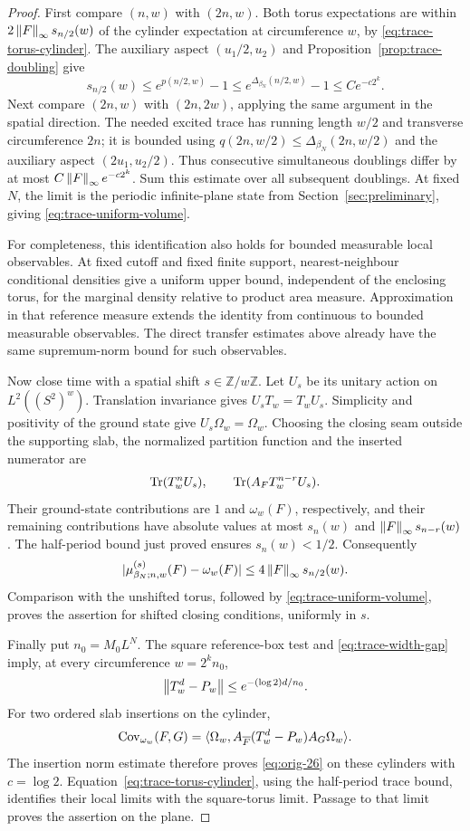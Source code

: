 \begin{proof}
First compare $(n,w)$ with $(2n,w)$.  Both torus expectations are
within $2\left\lVert F\right\rVert_\infty s_{n/2}(w)$ of the cylinder expectation at
circumference $w$, by \eqref{eq:trace-torus-cylinder}.  The auxiliary
aspect $(u_1/2,u_2)$ and Proposition~\ref{prop:trace-doubling} give
\[
 s_{n/2}(w)
    \le e^{p(n/2,w)}-1
    \le e^{\Delta_{\beta_N}(n/2,w)}-1
    \le C e^{-c2^k}.
\]
Next compare $(2n,w)$ with $(2n,2w)$, applying the same argument in
the spatial direction.  The needed excited trace has running length
$w/2$ and transverse circumference $2n$; it is bounded using
$q(2n,w/2)\le\Delta_{\beta_N}(2n,w/2)$ and the auxiliary aspect
$(2u_1,u_2/2)$.  Thus consecutive simultaneous doublings differ by
at most $C\left\lVert F\right\rVert_\infty e^{-c2^k}$.  Sum this estimate over all
subsequent doublings.  At fixed $N$, the limit is the periodic
infinite-plane state from Section~\ref{sec:preliminary}, giving
\eqref{eq:trace-uniform-volume}.

For completeness, this identification also holds for bounded
measurable local observables.  At fixed cutoff and fixed finite
support, nearest-neighbour conditional densities give a uniform upper
bound, independent of the enclosing torus, for the marginal density
relative to product area measure.  Approximation in that reference
measure extends the identity from continuous to bounded measurable
observables.  The direct transfer estimates above already have the
same supremum-norm bound for such observables.

Now close time with a spatial shift $s\in\mathbb Z/w\mathbb Z$.
Let $U_s$ be its unitary action on $L^2((S^2)^w)$.  Translation
invariance gives $U_sT_w=T_wU_s$.  Simplicity and positivity of the
ground state give $U_s\Omega_w=\Omega_w$.  Choosing the closing seam
outside the supporting slab, the normalized partition function and
the inserted numerator are
\[
 \operatorname{Tr}(T_w^nU_s),\qquad \operatorname{Tr}(A_FT_w^{n-r}U_s).
\]
Their ground-state contributions are $1$ and $\omega_w(F)$,
respectively, and their remaining contributions have absolute values
at most $s_n(w)$ and $\left\lVert F\right\rVert_\infty s_{n-r}(w)$.  The half-period
bound just proved ensures $s_n(w)<1/2$.  Consequently
\[
 |\mu_{\beta_N;n,w}^{(s)}(F)-\omega_w(F)|
     \le4\left\lVert F\right\rVert_\infty s_{n/2}(w).
\]
Comparison with the unshifted torus, followed by
\eqref{eq:trace-uniform-volume}, proves the assertion for shifted
closing conditions, uniformly in $s$.

Finally put $n_0=M_0L^N$.  The square reference-box test and
\eqref{eq:trace-width-gap} imply, at every circumference
$w=2^kn_0$,
\[
 \left\lVert T_w^d-P_w\right\rVert\le e^{-(\log2)d/n_0}.
\]
For two ordered slab insertions on the cylinder,
\[
 \operatorname{Cov}_{\omega_w}(F,G)
   =\langle\Omega_w,A_{\overline F}(T_w^d-P_w)A_G\Omega_w\rangle.
\]
The insertion norm estimate therefore proves
\eqref{eq:orig-26} on these cylinders with $c=\log2$.
Equation~\eqref{eq:trace-torus-cylinder}, using the half-period
trace bound, identifies their local limits with the square-torus
limit.  Passage to that limit proves the assertion on the plane.
\end{proof}

